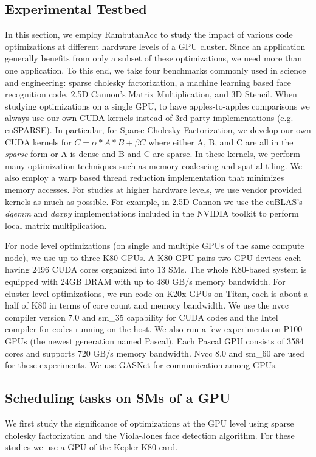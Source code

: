 \subsection{Experimental Testbed}
In this section, we employ RambutanAcc to study the impact of various code optimizations at different hardware levels of a GPU cluster.
Since an application generally benefits from only a subset of these optimizations, we need more than one application.
To this end, we take four benchmarks commonly used in science and engineering: sparse cholesky factorization, a machine learning based face recognition code, 2.5D Cannon's Matrix Multiplication, and 3D Stencil.
When studying optimizations on a single GPU, to have apples-to-apples comparisons we always use our own CUDA kernels instead of 3rd party implementations (e.g. cuSPARSE). 
In particular, for Sparse Cholesky Factorization, we develop our own CUDA kernels for $C = \alpha* A * B + \beta C$ where either A, B, and C are all in the {\em sparse} form or A is dense and B and C are sparse.
In these kernels, we perform many optimization techniques such as memory coalescing and spatial tiling.
We also employ a warp based thread reduction implementation that minimizes memory accesses. 
For studies at higher hardware levels, we use vendor provided kernels as much as possible.
For example, in  2.5D Cannon we use the cuBLAS's {\em dgemm} and {\em daxpy} implementations included in the NVIDIA toolkit to perform local matrix multiplication.

For node level optimizations (on single and multiple GPUs of the same compute node), we use up to three K80 GPUs.
A K80 GPU pairs two GPU devices each having 2496 CUDA cores organized into 13 SMs.
The whole K80-based system is equipped with 24GB DRAM with up to 480 GB/s memory bandwidth.
For cluster level optimizations, we run code on K20x GPUs on Titan, each is about a half of K80 in terms of core count and memory bandwidth.
We use the nvcc compiler version 7.0 and sm\_35 capability for CUDA codes and the Intel compiler for codes running on the host.
We also run a few experiments on P100 GPUs (the newest generation named Pascal).
Each Pascal GPU consists of 3584 cores and supports 720 GB/s memory bandwidth.
Nvcc 8.0 and sm\_60 are used for these experiments.
We use GASNet for communication among GPUs. 


\subsection{Scheduling tasks on SMs of a GPU}
We first study the significance of optimizations at the GPU level using sparse cholesky factorization and the Viola-Jones face detection algorithm.
For these studies we use a GPU of the Kepler K80 card.

